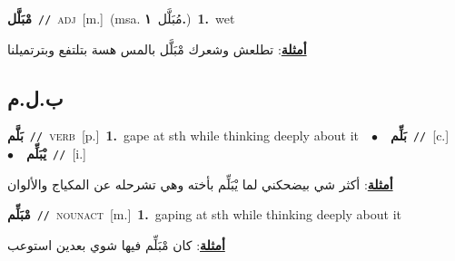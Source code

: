 \documentclass[10pt,a4paper,twoside]{article} %
\begin{document}
\begin{multicols}{2}
{\setlength\topsep{0pt}\textbf{\foreignlanguage{arabic}{مْبَلَّل}}\ {\color{gray}\texttt{//}\color{black}}\ \textsc{adj}\ [m.]\ \color{gray}(msa. \foreignlanguage{arabic}{مُبَلَّل}~\foreignlanguage{arabic}{\textbf{١.}})\color{black}\ \textbf{1.}~wet\  \begin{flushright}\color{gray}\foreignlanguage{arabic}{\textbf{\underline{\foreignlanguage{arabic}{أمثلة}}}: تطلعش وشعرك مْبَلَّل بالمس هسة بتلتفع وبترتميلنا}\end{flushright}\color{black}} \vspace{2mm}

\vspace{-3mm}
\subsection*{\color{blue}\foreignlanguage{arabic}{ب.ل.م}\color{blue}{}} 

{\setlength\topsep{0pt}\textbf{\foreignlanguage{arabic}{بَلَّم}}\ {\color{gray}\texttt{//}\color{black}}\ \textsc{verb}\ [p.]\ \textbf{1.}~gape at sth while thinking deeply about it\ \ $\bullet$\ \ \setlength\topsep{0pt}\textbf{\foreignlanguage{arabic}{بَلِّم}}\ {\color{gray}\texttt{//}\color{black}}\ [c.]\ \ $\bullet$\ \ \setlength\topsep{0pt}\textbf{\foreignlanguage{arabic}{يْبَلِّم}}\ {\color{gray}\texttt{//}\color{black}}\ [i.]\  \begin{flushright}\color{gray}\foreignlanguage{arabic}{\textbf{\underline{\foreignlanguage{arabic}{أمثلة}}}: أكثر شي بيضحكني لما يْبَلِّم بأخته وهي تشرحله عن المكياج والألوان}\end{flushright}\color{black}} \vspace{2mm}

{\setlength\topsep{0pt}\textbf{\foreignlanguage{arabic}{مْبَلِّم}}\ {\color{gray}\texttt{//}\color{black}}\ \textsc{noun\textunderscore act}\ [m.]\ \textbf{1.}~gaping at sth while thinking deeply about it\  \begin{flushright}\color{gray}\foreignlanguage{arabic}{\textbf{\underline{\foreignlanguage{arabic}{أمثلة}}}: كان مْبَلِّم فيها شوي بعدين استوعب}\end{flushright}\color{black}} \vspace{2mm}


\end{multicols}
\end{document}
